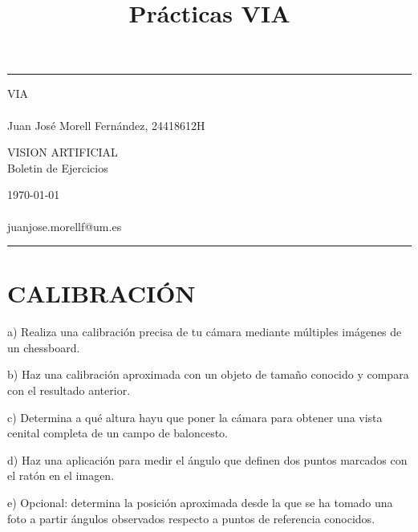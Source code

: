 \documentclass[a4paper]{article} %
\begin{document}

\title{Prácticas VIA} %
\fancyhead[C]{}
\hrule \medskip %
\begin{minipage}{0.295\textwidth} %
\raggedright
VIA\\ %
\footnotesize %
\hfill\\
Juan José Morell Fernández, 24418612H%
\end{minipage}
\begin{minipage}{0.4\textwidth} %
\centering 
\large %
VISION ARTIFICIAL\\ %
\normalsize %
Boletin de Ejercicios\\ %
\end{minipage}
\begin{minipage}{0.295\textwidth} %
\raggedleft
\today\\ %
\footnotesize %
\hfill\\
juanjose.morellf@um.es %
\end{minipage}
\medskip\hrule %
\bigskip

\tableofcontents
\newpage


\section{CALIBRACIÓN}

\begin{tcolorbox}[breakable,notitle,boxrule=0pt,colback=lightgray,colframe=lightgray]
a) Realiza una calibración precisa de tu cámara mediante múltiples imágenes de un chessboard. 

b) Haz una calibración aproximada con un objeto de tamaño conocido y compara con el resultado anterior. 

c) Determina a qué altura hayu que poner la cámara para obtener una vista cenital completa de un campo de baloncesto. 

d) Haz una aplicación para medir el ángulo que definen dos puntos marcados con el ratón en el imagen. 

e) Opcional: determina la posición aproximada desde la que se ha tomado una foto a partir ángulos observados respecto a puntos de referencia conocidos.
\end{tcolorbox}
\end{document}
